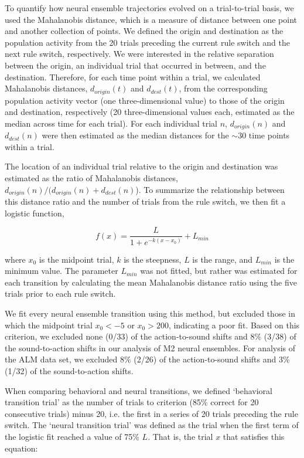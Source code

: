 To quantify how neural ensemble trajectories evolved on a trial-to-trial basis, we used the Mahalanobis distance, which is a measure of distance between one point and another collection of points. We defined the origin and destination as the population activity from the 20 trials preceding the current rule switch and the next rule switch, respectively. We were interested in the relative separation between the origin, an individual trial that occurred in between, and the destination. Therefore, for each time point within a trial, we calculated Mahalanobis distances, $d_{origin}(t)$ and $d_{dest}(t)$, from the corresponding population activity vector (one three-dimensional value) to those of the origin and destination, respectively (20 three-dimensional values each, estimated as the median across time for each trial). For each individual trial $n$, $d_{origin}(n)$ and $d_{dest}(n)$ were then estimated as the median distances for the $\sim 30$ time points within a trial. 

The location of an individual trial relative to the origin and destination was estimated as the ratio of Mahalanobis distances, $d_{origin}(n)/(d_{origin}(n) + d_{dest}(n)$). To summarize the relationship between this distance ratio and the number of trials from the rule switch, we then fit a logistic function,

\begin{equation*}
f(x) = \frac{L}{1+e^{-k(x-x_0)}} + L_{min}
\end{equation*}

\noindent where $x_0$ is the midpoint trial, $k$ is the steepness, $L$ is the range, and $L_{min}$ is the minimum value. The parameter $L_{min}$ was not fitted, but rather was estimated for each transition by calculating the mean Mahalanobis distance ratio using the five trials prior to each rule switch. 

We fit every neural ensemble transition using this method, but excluded those in which the midpoint trial $x_0 < -5$ or $x_0 > 200$, indicating a poor fit. Based on this criterion, we excluded none (0/33) of the action-to-sound shifts and 8\% (3/38) of the sound-to-action shifts in our analysis of M2 neural ensembles. For analysis of the ALM data set, we excluded 8\% (2/26) of the action-to-sound shifts and 3\% (1/32) of the sound-to-action shifts. 

When comparing behavioral and neural transitions, we defined `behavioral transition trial' as the number of trials to criterion (85\% correct for 20 consecutive trials) minus 20, i.e. the first in a series of 20 trials preceding the rule switch. The `neural transition trial' was defined as the trial when the first term of the logistic fit reached a value of 75\% $L$. That is, the trial $x$ that satisfies this equation:

